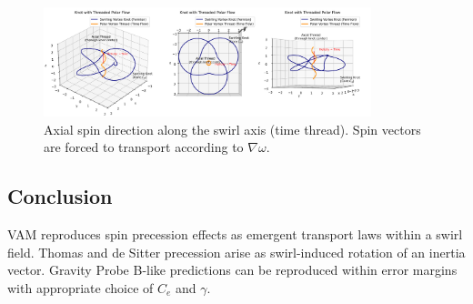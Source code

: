 \begin{figure}[h!]
\centering
\includegraphics[width=0.85\textwidth]{KnotThreadedPolarFlow}
\caption{Axial spin direction along the swirl axis (time thread). Spin vectors are forced to transport according to \( \nabla \omega \).}
\label{fig:threadedflow}
\end{figure}

\subsection*{Conclusion}
VAM reproduces spin precession effects as emergent transport laws within a swirl field. Thomas and de Sitter precession arise as swirl-induced rotation of an inertia vector. Gravity Probe B-like predictions can be reproduced within error margins with appropriate choice of \( C_e \) and \( \gamma \).